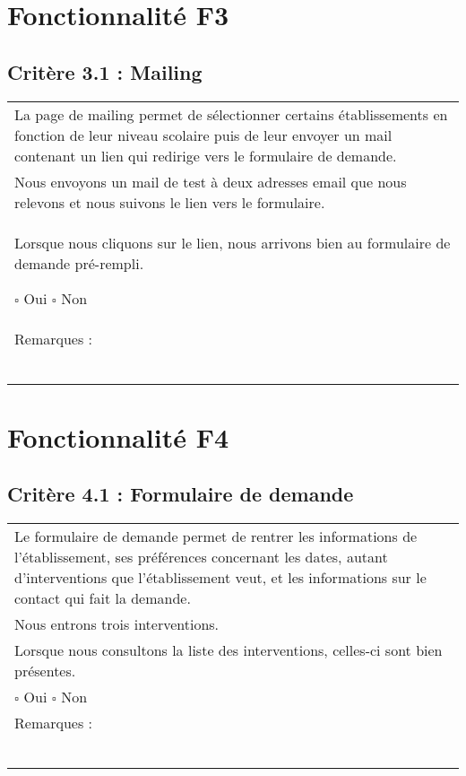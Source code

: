   		
\section{Fonctionnalité F3}
\subsection*{Critère 3.1 : Mailing }
  		\begin{center}
    	 		\begin{tabular}[h]{|p{}|}
			\hline
				La page de mailing permet de sélectionner certains établissements en fonction de leur niveau scolaire puis de leur envoyer un mail contenant un lien qui redirige vers le formulaire de demande. \\
				Nous envoyons un mail de test à deux adresses email que nous relevons et nous suivons le lien vers le formulaire. \\
				Lorsque nous cliquons sur le lien, nous arrivons bien au formulaire de demande pré-rempli.
				
				$\square$ Oui  \hfill \hfill $\square$ Non \\\hline Remarques : \\ ~\\
			 \\\hline
     		\end{tabular}
  		\end{center}	

\section{Fonctionnalité F4}
	\subsection*{Critère 4.1 : Formulaire de demande }
  		\begin{center}
    	 		\begin{tabular}[h]{|p{}|}
			\hline
				Le formulaire de demande permet de rentrer les informations de l'établissement, ses préférences concernant les dates, autant d'interventions que l'établissement veut, et les informations sur le contact qui fait la demande.\\
				Nous entrons trois interventions. \\
				Lorsque nous consultons la liste des interventions, celles-ci sont bien présentes. \\
				
				$\square$ Oui  \hfill \hfill $\square$ Non \\\hline Remarques : \\ ~\\
			 \\\hline
     		\end{tabular}
  		\end{center}	
  		
